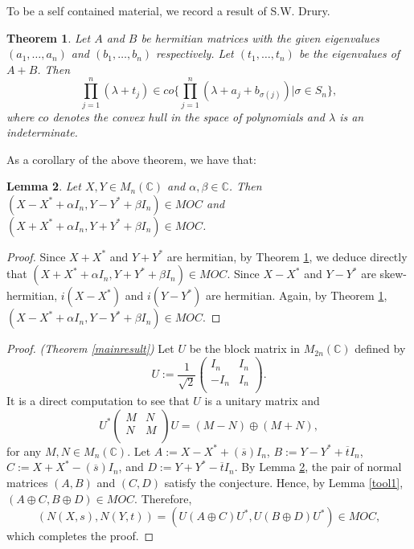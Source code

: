 \documentclass[11pt]{amsart}
\numberwithin{equation}{section}
\newtheorem{thm}{Theorem}[section]
\newtheorem{lem}[thm]{Lemma}
\numberwithin{equation}{section}
\begin{document}
To be a self contained material, we record a result of S.W. Drury. 
\begin{thm}\label{key1}\cite{Dru4}
	Let $A$ and $B$ be hermitian matrices with the given eigenvalues $(a_1,\dots, a_n)$ and $(b_1,\dots,b_n)$ respectively.  Let $(t_1,\dots,t_n)$ be the eigenvalues of $A+B$.  Then
	$$\prod_{j=1}^n (\lambda+t_j)\in co\{\prod_{j=1}^n(\lambda+a_j+b_{\sigma(j)}) | \sigma \in S_n \},  $$
	where $co$ denotes the convex hull in the space of polynomials and $\lambda$ is an indeterminate.
\end{thm}
As a corollary of the above theorem, we have that:
\begin{lem} \label{tool2}
	Let $X,Y\in M_n(\mathbb{C})$ and $\alpha,\beta\in \mathbb{C}$. Then $(X-X^*+\alpha I_n,Y-Y^*+\beta I_n) \in MOC$  and $(X+X^*+\alpha I_n,Y+Y^*+\beta I_n) \in MOC$.
\end{lem}
\begin{proof}
	Since $X+X^*$ and $Y+Y^*$ are hermitian, by Theorem \ref{key1}, we deduce directly that $(X+X^*+\alpha I_n,Y+Y^*+\beta I_n) \in MOC$.  Since $X-X^*$ and $Y-Y^*$ are skew-hermitian, $i(X-X^*)$ and $i(Y-Y^*)$ are hermitian.  Again, by Theorem \ref{key1}, $(X-X^*+\alpha I_n,Y-Y^*+\beta I_n) \in MOC$.

\end{proof}

\begin{proof}

\textit{(Theorem \ref{mainresult})} Let $U$ be the block matrix in $M_{2n}(\mathbb{C})$ defined by $$U:=\frac{1}{\sqrt{2}}\left(
\begin{array}{cc}
I_n & I_n \\
-I_n & I_n \\
\end{array}
\right).$$
It is a direct computation to see that $U$ is a unitary matrix and $$ U^*\left(\begin{array}{cc}
M & N \\
N & M \\
\end{array}\right)
U= (M-N)\oplus (M+N), $$
for any $M,N\in M_n(\mathbb{C})$.  Let $A:=X-X^*+(\overline{s}) I_n$, $B:=Y-Y^*+\overline{t} I_n$, $C:=X+X^*-(\overline{s}) I_n$, and  $D:=Y
+Y^*-\overline{t} I_n$. By Lemma \ref{tool2}, the pair of normal matrices $(A,B)$ and $(C,D)$ satisfy the conjecture. Hence, by Lemma \ref{tool1}, $(A\oplus C, B \oplus D)\in MOC$.  Therefore,
$$(N(X,s),N(Y,t))=(U (A\oplus C)U^*,U (B\oplus D)U^* )\in MOC, $$
which completes the proof.
\end{proof}
\end{document}
